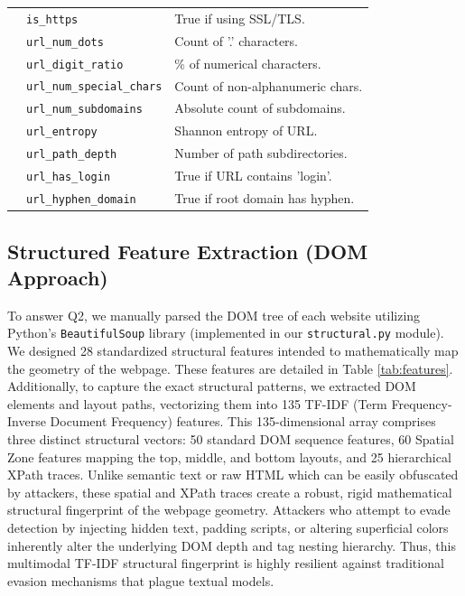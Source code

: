 \documentclass[conference]{IEEEtran}
\begin{document}
\begin{table}[t]
\begin{center}
\begin{tabular}{llp{10cm}}
& \texttt{is\_https} & True if using SSL/TLS. \\
& \texttt{url\_num\_dots} & Count of '.' characters. \\
& \texttt{url\_digit\_ratio} & \% of numerical characters. \\
& \texttt{url\_num\_special\_chars} & Count of non-alphanumeric chars. \\
& \texttt{url\_num\_subdomains} & Absolute count of subdomains. \\
& \texttt{url\_entropy} & Shannon entropy of URL. \\
& \texttt{url\_path\_depth} & Number of path subdirectories. \\
& \texttt{url\_has\_login} & True if URL contains 'login'. \\
& \texttt{url\_hyphen\_domain} & True if root domain has hyphen. \\
\bottomrule
\end{tabular}
\end{center}
\end{table}

\subsection{Structured Feature Extraction (DOM Approach)}
To answer Q2, we manually parsed the DOM tree of each website utilizing Python's \texttt{BeautifulSoup} library (implemented in our \texttt{structural.py} module). We designed 28 standardized structural features intended to mathematically map the geometry of the webpage. These features are detailed in Table \ref{tab:features}. Additionally, to capture the exact structural patterns, we extracted DOM elements and layout paths, vectorizing them into 135 TF-IDF (Term Frequency-Inverse Document Frequency) features. This 135-dimensional array comprises three distinct structural vectors: 50 standard DOM sequence features, 60 Spatial Zone features mapping the top, middle, and bottom layouts, and 25 hierarchical XPath traces. Unlike semantic text or raw HTML which can be easily obfuscated by attackers, these spatial and XPath traces create a robust, rigid mathematical structural fingerprint of the webpage geometry. Attackers who attempt to evade detection by injecting hidden text, padding scripts, or altering superficial colors inherently alter the underlying DOM depth and tag nesting hierarchy. Thus, this multimodal TF-IDF structural fingerprint is highly resilient against traditional evasion mechanisms that plague textual models.
\end{document}

